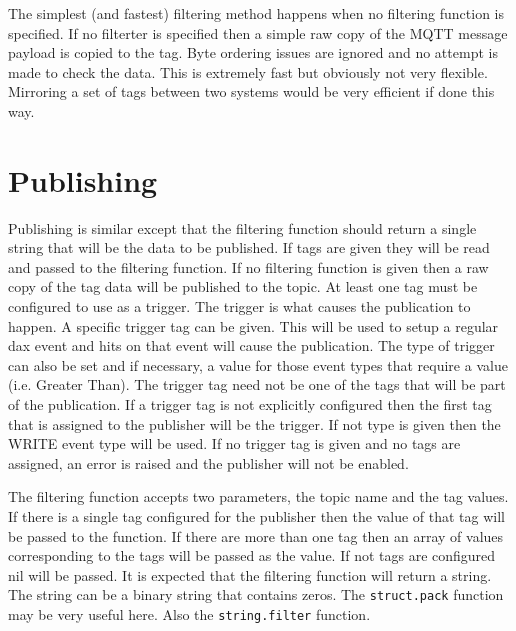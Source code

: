 The simplest (and fastest) filtering method happens when no filtering function
is specified.  If no filterter is specified then a simple raw copy of the MQTT
message payload is copied to the tag.  Byte ordering issues are ignored and no
attempt is made to check the data.  This is extremely fast but obviously not
very flexible.  Mirroring a set of tags between two \opendax systems would be
very efficient if done this way.

\section{Publishing}

Publishing is similar except that the filtering function should return a single
string that will be the data to be published.  If tags are given they will be
read and passed to the filtering function.  If no filtering function is given
then a raw copy of the tag data will be published to the topic.  At least one
tag must be configured to use as a trigger.  The trigger is what causes the
publication to happen.  A specific trigger tag can be given.  This will be used
to setup a regular dax event and hits on that event will cause the publication. 
The type of trigger can also be set and if necessary, a value for those event
types that require a value (i.e. Greater Than).  The trigger tag need not be one
of the tags that will be part of the publication.  If a trigger tag is not
explicitly configured then the first tag that is assigned to the publisher will
be the trigger.  If not type is given then the WRITE event type will be used. 
If no trigger tag is given and no tags are assigned, an error is raised and the
publisher will not be enabled.

The filtering function accepts two parameters, the topic name and the tag
values.  If there is a single tag configured for the publisher then the value of
that tag will be passed to the function.  If there are more than one tag then an
array of values corresponding to the tags will be passed as the value.  If not
tags are configured nil will be passed.  It is expected that the filtering
function will return a string.  The string can be a binary string that contains
zeros.  The \texttt{struct.pack} function may be very useful here.  Also the
\texttt{string.filter} function.
